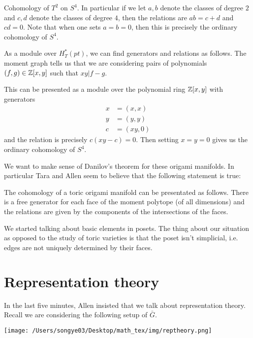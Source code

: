 \documentclass[12pt]{article}
\begin{document}
\begin{example}
    Cohomology of $T^2$ on $S^4$. In particular if we let $a,b$ denote the classes of degree
    $2$ and $c,d$ denote the classes of degree $4$, then the relations are $ab = c + d$ and $cd = 0$.
    Note that when one sets $a = b = 0$, then this is precisely the ordinary cohomology of $S^4$.

    \hfill

    As a module over $H_T^*(pt)$, we can find generators and relations as follows. The moment graph
    tells us that we are considering pairs of polynomials $(f,g)\in \mathbb{Z}[x,y]$ such that $xy\vert f-g$.

    \hfill

    This can be presented as a module over the polynomial ring $\mathbb{Z}[x,y]$ with generators \begin{align*}
        x &= (x,x) \\
        y &= (y,y) \\
        c &= (xy,0)
    \end{align*} and the relation is precisely $c(xy-c) = 0$. Then setting $x = y = 0$ gives us the ordinary cohomology of $S^4$.
\end{example}

We want to make sense of Danilov's theorem for these origami manifolds. In particular Tara and Allen seem
to believe that the following statement is true:

\begin{conjecture}
    The cohomology of a toric origami manifold can be presentated as follows. There is a 
    free generator for each face of the moment polytope (of all dimensions) and the relations are given by the
    components of the intersections of the faces.
\end{conjecture}

We started talking about basic elements in posets.
The thing about our situation as opposed to the study of 
toric varieties is that the poset isn't simplicial, i.e. edges are not uniquely determined by their faces.

\section{Representation theory}
In the last five minutes, Allen insisted that we talk about representation theory.
Recall we are considering the following setup of $\bar{G}$.

\begin{center}
    \texttt{[image: /Users/songye03/Desktop/math\_tex/img/reptheory.png]}
\end{center}
\end{document}
